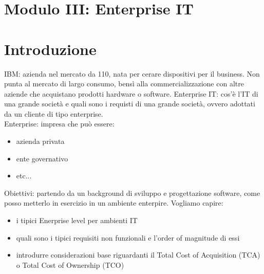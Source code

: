 \documentclass{article}
\begin{document}
\newpage
\section{Modulo III: Enterprise IT}
\section{Introduzione}
IBM: azienda nel mercato da 110, nata per cerare dispositivi per il business. Non punta al mercato di largo consumo, bensì alla commercializzazione con altre aziende che acquistano prodotti hardware o software. Enterprise IT: cos'è l'IT di una grande società e quali sono i requisti di una grande società, ovvero adottati da un cliente di tipo enterprise.\\ Enterprise: impresa che può essere:
\begin{itemize}
\item azienda privata
\item ente governativo
\item etc...
\end{itemize}
Obiettivi: partendo da un background di sviluppo e progettazione software, come posso metterlo in esercizio in un ambiente enterpire. Vogliamo capire:
\begin{itemize}
\item i tipici Enerprise level per ambienti IT
\item quali sono i tipici requisiti non funzionali e l'order of magnitude di essi
\item introdurre considerazioni base riguardanti il Total Cost of Acquisition (TCA) o Total Cost of Ownership (TCO)
\end{itemize}
\end{document}
